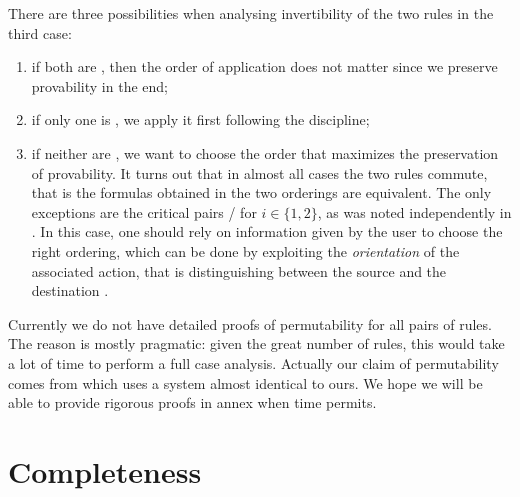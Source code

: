 \begin{scope}
There are three possibilities when analysing invertibility of the two rules in
the third case:
\begin{enumerate}
  \item if both are , then the order of application does not matter
  since we preserve provability in the end;
  \item if only one is , we apply it first following the 
  discipline;
  \item if neither are , we want to choose the order that
  maximizes the preservation of provability. It turns out that in almost all
  cases the two rules commute, that is the formulas obtained in the two
  orderings are equivalent. The only exceptions are the critical pairs
  / for $i \in \{1,2\}$, as was noted
  independently in . In this case, one
  should rely on information given by the user to choose the right ordering,
  which can be done by exploiting the \emph{orientation} of the associated
   action, that is distinguishing between the source  and the
  destination .
\end{enumerate}
Currently we do not have detailed proofs of permutability for all pairs of
rules. The reason is mostly pragmatic: given the great number of rules, this
would take a lot of time to perform a full case analysis. Actually our claim of
permutability comes from \cite{DBLP:conf/cade/Chaudhuri21} which uses a
 system almost identical to ours. We hope we will be able to
provide rigorous proofs in annex when time permits.

\section{Completeness}


\end{scope}
